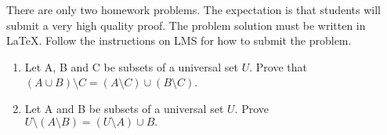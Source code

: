 \documentclass{article}
\begin{document}

There are only two homework problems. The expectation is that students
will submit a very high quality proof. The problem solution must be written
in LaTeX. Follow the instructions on LMS for how to submit the problem.


\begin{enumerate}
\item Let A, B and C be subsets of a universal set $U.$ Prove that $(A \cup B)\setminus C = (A \setminus C) \cup (B \setminus C) $.

\item Let A and B be subsets of a universal set $U.$ Prove $U\setminus(A \setminus B) = (U\setminus A)\cup B.$  

\end{enumerate}
\end{document}
